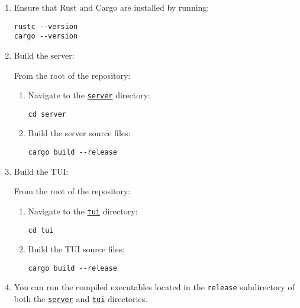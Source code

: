 \begin{enumerate}
    \item Ensure that Rust and Cargo are installed by running:
    
    \begin{lstlisting}
rustc --version
cargo --version
    \end{lstlisting}
    
    \item Build the server:
    
    From the root of the repository:
    
    \begin{enumerate}
        \item Navigate to the \href{https://github.com/christiansassi/advanced-programming-of-cryptographic-methods-project/tree/main/server}{\texttt{server}} directory:
        
        \begin{lstlisting}
cd server
        \end{lstlisting}
        
        \item Build the server source files:
        
        \begin{lstlisting}
cargo build --release
        \end{lstlisting}
    \end{enumerate}
    
    \item Build the TUI:
    
    From the root of the repository:
    
    \begin{enumerate}
        \item Navigate to the \href{https://github.com/christiansassi/advanced-programming-of-cryptographic-methods-project/tree/main/tui}{\texttt{tui}} directory:
        
        \begin{lstlisting}
cd tui
        \end{lstlisting}
        
        \item Build the TUI source files:
        
        \begin{lstlisting}
cargo build --release
        \end{lstlisting}
    \end{enumerate}
    
    \item You can run the compiled executables located in the \texttt{release} subdirectory of both the \href{https://github.com/christiansassi/advanced-programming-of-cryptographic-methods-project/tree/main/server/target/release}{\texttt{server}} and \href{https://github.com/christiansassi/advanced-programming-of-cryptographic-methods-project/tree/main/tui/target/release}{\texttt{tui}} directories.
\end{enumerate}

